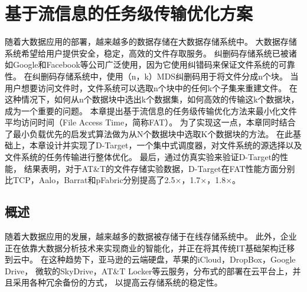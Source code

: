 \chapter{基于流信息的任务级传输优化方案}
\label{cha:erasure_coding}
随着大数据应用的部署，越来越多的数据存储在大数据存储系统中。
大数据存储系统希望给用户提供安全，稳定，高效的文件存取服务。
纠删码存储系统已被诸如Google和Facebook等公司广泛使用，因为它使用纠错码来保证文件系统的可靠性。
在纠删码存储系统中，使用（n，k）MDS纠删码用于将文件分成n个块。
当用户想要访问文件时，文件系统可以选取n个块中的任何k个子集来重建文件。
在这种情况下，如何从n个数据块中选出k个数据集，如何高效的传输这k个数据块，成为一个重要的问题。
本章提出基于流信息的任务级传输优化方法来最小化文件平均访问时间（File Access Time，简称FAT）。
为了实现这一点，本章同时结合了最小负载优先的启发式算法做为从N个数据块中选取K个数据块的方法。
在此基础上，本章设计并实现了D-Target，一个集中式调度器，对文件系统的源选择以及文件系统的任务传输进行整体优化。
最后，通过仿真实验来验证D-Target的性能，
结果表明，对于AT\&T的文件存储实验数据，D-Target在FAT性能方面分别比TCP，Aalo，Barrat和pFabric分别提高了2.5$\times$，1.7$\times$，1.8$\times$。

\section{概述}
\label{erasure_coding:introduction}
随着大数据应用的发展，越来越多的数据被存储于在线存储系统中。
此外，企业正在依靠大数据分析技术来实现商业的智能化，并正在将其传统IT基础架构迁移到云中。
在这种趋势下，亚马逊的云端硬盘，苹果的iCloud，DropBox，Google Drive，
微软的SkyDrive，AT\&T Locker等云服务，分布式的部署在云平台上，并且采用各种冗余备份的方式，
以提高云存储系统的稳定性。


